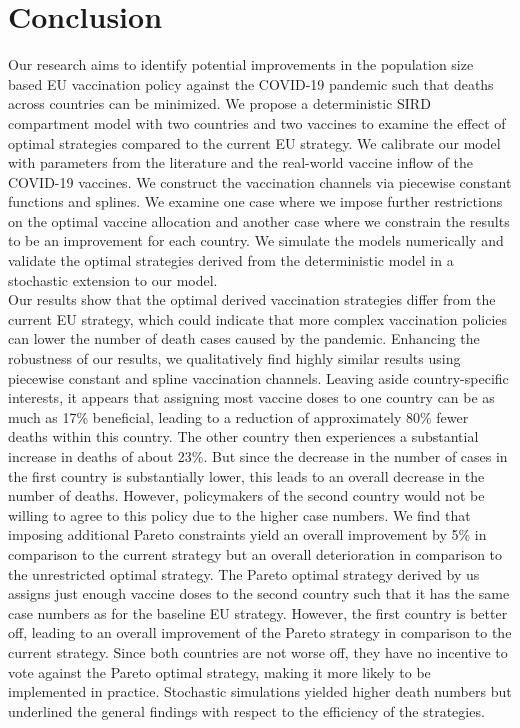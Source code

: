 \section{Conclusion}
Our research aims to identify potential improvements in the population size based EU vaccination policy against the COVID-19 pandemic such that deaths across countries can be minimized. We propose a deterministic SIRD compartment model with two countries and two vaccines to examine the effect of optimal strategies compared to the current EU strategy. We calibrate our model with parameters from the literature and the real-world vaccine inflow of the COVID-19 vaccines. We construct the vaccination channels via piecewise constant functions and splines. We examine one case where we impose further restrictions on the optimal vaccine allocation and another case where we constrain the results to be an improvement for each country. We simulate the models numerically and validate the optimal strategies derived from the deterministic model in a stochastic extension to our model.\\

Our results show that the optimal derived vaccination strategies differ from the current EU strategy, which could indicate that more complex vaccination policies can lower the number of death cases caused by the pandemic. Enhancing the robustness of our results, we qualitatively find highly similar results using piecewise constant and spline vaccination channels. Leaving aside country-specific interests, it appears that assigning most vaccine doses to one country can be as much as 17\% beneficial, leading to a reduction of approximately 80\% fewer deaths within this country. The other country then experiences a substantial increase in deaths of about 23\%. But since the decrease in the number of cases in the first country is substantially lower, this leads to an overall decrease in the number of deaths. However, policymakers of the second country would not be willing to agree to this policy due to the higher case numbers. We find that imposing additional Pareto constraints yield an overall improvement by 5\% in comparison to the current strategy but an overall deterioration in comparison to the unrestricted optimal strategy. The Pareto optimal strategy derived by us assigns just enough vaccine doses to the second country such that it has the same case numbers as for the baseline EU strategy. However, the first country is better off, leading to an overall improvement of the Pareto strategy in comparison to the current strategy. Since both countries are not worse off, they have no incentive to vote against the Pareto optimal strategy, making it more likely to be implemented in practice. Stochastic simulations yielded higher death numbers but underlined the general findings with respect to the efficiency of the strategies.

